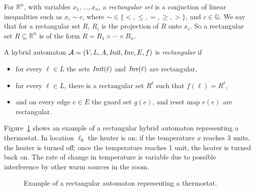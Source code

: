 \begin{defi}
For $\mathbb{R}^{n}$, with variables $x_{1},\ldots,x_{n}$, a \emph{rectangular set} is a conjuction of linear inequalities such as $x_{i}\sim c$, where $\sim\in\{<,\leq,=,\geq,>\}$, and $c\in\mathbb{Q}$. We say that for a rectangular set $R$, $R_{i}$ is the projection of $R$ onto $x_{i}$. So a rectangular set $R\subseteq\mathbb{R}^{n}$ is of the form $R=R_{1}\times\cdots\times R_{n}$.
\end{defi}

\begin{defi}[Rectangular HA]
A hybrid automaton $\mathcal{A} = (V,L,A,\mathit{Init},\mathit{Inv},E,f)$ is \emph{rectangular} if
\begin{itemize}
    \item{for every $\ell\in L$ the sets $\mathit{Init}(\ell)$ and $\mathit{Inv}(\ell)$ are rectangular,}
    \item{for every $\ell\in L$, there is a rectangular set $R^{\ell}$ such that $f(\ell)=R^{\ell}$,}
    \item{and on every edge $e\in E$ the guard set $g(e)$, and reset map $r(e)$ are rectangular.}
\end{itemize}
\end{defi}

\begin{ex}
Figure~\ref{fig:exrect} shows an example of a rectangular hybrid automaton representing a thermostat. In location $\ell_{0}$ the heater is on; if the temperature $x$ reaches 3 units, the heater is turned off; once the temperature reaches 1 unit, the heater is turned back on. The rate of change in temperature is variable due to possible interference by other warm sources in the room.
\begin{figure}[H]
    \begin{center}
        \caption{Example of a rectangular automaton representing a thermostat.}
        \label{fig:exrect}
    \end{center}
\end{figure}
\end{ex}


